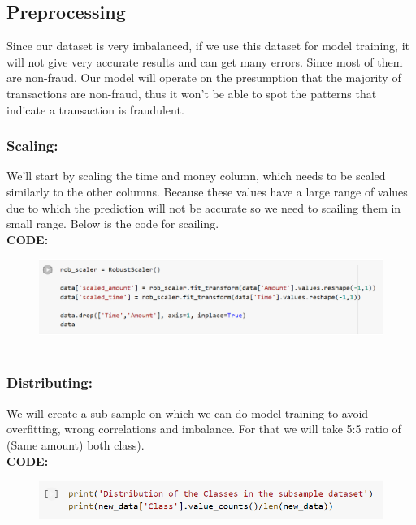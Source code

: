 \documentclass{article}
\begin{document}
\subsection{Preprocessing}

Since our dataset is very imbalanced, if we use this dataset for model training, it will not give very accurate results and can get many errors. Since most of them are non-fraud, Our model will operate on the presumption that the majority of transactions are non-fraud, thus it won't be able to spot the patterns that indicate a transaction is fraudulent.

\subsubsection{Scaling:}
We'll start by scaling the time and money column, which needs to be scaled similarly to the other columns. Because these values have a large range of values due to which the prediction will not be accurate so we need to scailing them in small range. Below is the code for scailing.\\

\noindent\textbf{CODE:}
\begin{figure}[!h]
\centering
\includegraphics[width = 4.5 in]{img14.png}~
\end{figure}



\subsubsection{Distributing:}
We will create a sub-sample on which we can do model training to avoid overfitting, wrong correlations and imbalance. For that we will take 5:5 ratio of (Same amount) both class).\\

\noindent\textbf{CODE:}
\begin{figure}[!h]
\centering
\includegraphics[width = 4.5 in]{img15.png}~
\end{figure}
\end{document}
